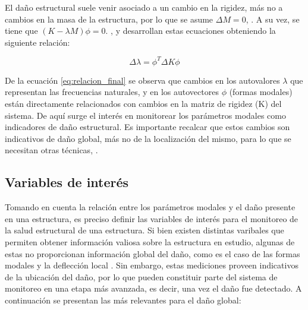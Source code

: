 El daño estructural suele venir asociado a un cambio en la rigidez, más no a cambios en la masa de la estructura, por lo que se asume $\Delta M = 0$, \citep{hearn1991modal}. A su vez, se tiene que $(K - \lambda M)\phi = 0$. \citet{mohamed2014}, \citet{shi1998structural} y \citet{hearn1991modal} desarrollan estas ecuaciones obteniendo la siguiente relación:

\begin{equation} \label{eq:relacion_final}
    \Delta\lambda = \phi^T \Delta K \phi
\end{equation}

De la ecuación \ref{eq:relacion_final} se observa que cambios en los autovalores $\lambda$ que representan las frecuencias naturales, y en los autovectores $\phi$ (formas modales) están directamente relacionados con cambios en la matriz de rigidez (K) del sistema. De aquí surge el interés en monitorear los parámetros modales como indicadores de daño estructural. Es importante recalcar que estos cambios son indicativos de daño global, más no de la localización del mismo, para lo que se necesitan otras técnicas, \citep{mohamed2014}.

\subsection{Variables de interés}

Tomando en cuenta la relación entre los parámetros modales y el daño presente en una estructura, es preciso definir las variables de interés para el monitoreo de la salud estructural de una estructura. Si bien existen distintas varibales que permiten obtener información valiosa sobre la estructura en estudio, algunas de estas no proporcionan información global del daño, como es el caso de las formas modales y la deflección local \citep{rytter1993vibration}. Sin embargo, estas mediciones proveen indicativos de la ubicación del daño, por lo que pueden constituir parte del sistema de monitoreo en una etapa más avanzada, es decir, una vez el daño fue detectado. A continuación se presentan las más relevantes para el daño global:


